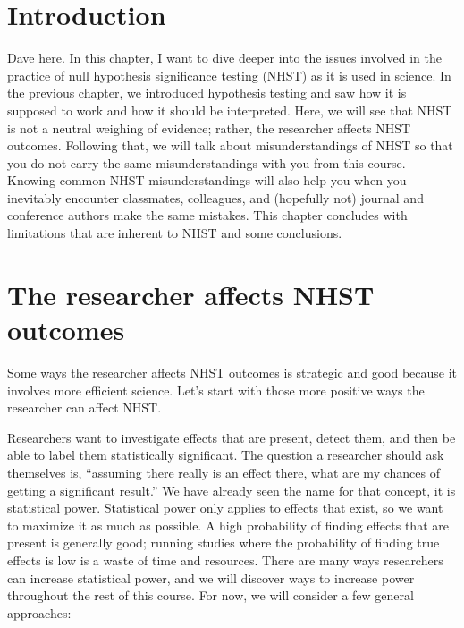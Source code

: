 \documentclass[
]{book}
\begin{document}
\hypertarget{introduction-4}{%
\section{Introduction}\label{introduction-4}}

Dave here. In this chapter, I want to dive deeper into the issues involved in the practice of null hypothesis significance testing (NHST) as it is used in science. In the previous chapter, we introduced hypothesis testing and saw how it is supposed to work and how it should be interpreted. Here, we will see that NHST is not a neutral weighing of evidence; rather, the researcher affects NHST outcomes. Following that, we will talk about misunderstandings of NHST so that you do not carry the same misunderstandings with you from this course. Knowing common NHST misunderstandings will also help you when you inevitably encounter classmates, colleagues, and (hopefully not) journal and conference authors make the same mistakes. This chapter concludes with limitations that are inherent to NHST and some conclusions.

\hypertarget{the-researcher-affects-nhst-outcomes}{%
\section{The researcher affects NHST outcomes}\label{the-researcher-affects-nhst-outcomes}}

Some ways the researcher affects NHST outcomes is strategic and good because it involves more efficient science. Let's start with those more positive ways the researcher can affect NHST.

Researchers want to investigate effects that are present, detect them, and then be able to label them statistically significant. The question a researcher should ask themselves is, ``assuming there really is an effect there, what are my chances of getting a significant result.'' We have already seen the name for that concept, it is statistical power. Statistical power only applies to effects that exist, so we want to maximize it as much as possible. A high probability of finding effects that are present is generally good; running studies where the probability of finding true effects is low is a waste of time and resources. There are many ways researchers can increase statistical power, and we will discover ways to increase power throughout the rest of this course. For now, we will consider a few general approaches:
\end{document}
